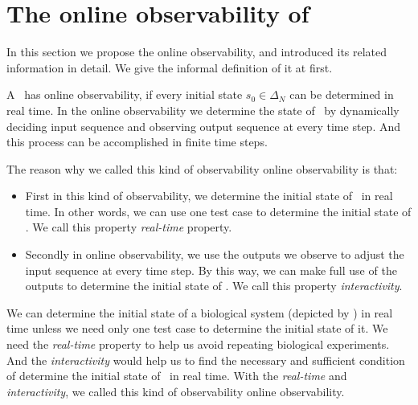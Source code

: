 \section{The online observability of \BCNs}
\label{sec:online}
In this section we propose the online observability, and introduced its related information in detail. We give the informal definition of it at first. 

	A \BCN\ has online observability, if every initial state $s_0 \in \Delta_N$ can be determined in real time. In the online observability we determine the state of \BCN\ by dynamically deciding input sequence and observing output sequence at every time step. And this process can be accomplished in finite time steps.

The reason why we called this kind of observability online observability is that:
\begin{itemize}
  \item First in this kind of observability, we determine the initial state of \BCNs\ in real time. In other words, we can use one test case to determine the initial state of \BCNs. We call this property {\em real-time} property.%
  \item  Secondly in online observability, we use the outputs we observe to adjust the input sequence at every time step. By this way, we can make full use of the outputs to determine the initial state of \BCNs. We call this property {\em interactivity}.
\end{itemize} 

We can determine the initial state of a biological system (depicted by \BCN) in real time unless we need only one test case to determine the initial state of it. We need the {\em real-time} property to help us avoid repeating biological experiments. And the {\em interactivity} would help us to find the necessary and sufficient condition of determine the initial state of \BCNs\ in real time. With the  {\em real-time} and {\em interactivity}, we called this kind of observability online observability.

